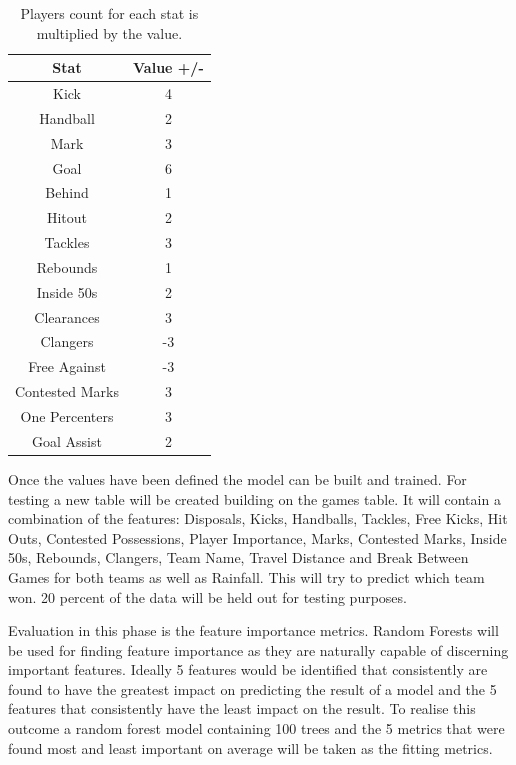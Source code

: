 \documentclass{imc-inf}
\begin{document}
	\begin{table}[h!]
		\centering	
		\begin{tabular}{| c | c |}
			\hline
			Stat & Value +/- \\
			\hline
			Kick & 4 \\
			\hline
			Handball & 2 \\
			\hline
			Mark & 3 \\
			\hline
			Goal & 6 \\
			\hline
			Behind & 1 \\
			\hline
			Hitout & 2 \\
			\hline
			Tackles & 3 \\
			\hline
			Rebounds & 1 \\
			\hline
			Inside 50s & 2\\
			\hline
			Clearances & 3 \\
			\hline
			Clangers & -3 \\
			\hline
			Free Against & -3 \\
			\hline
			Contested Marks & 3 \\
			\hline
			One Percenters & 3 \\
			\hline
			Goal Assist & 2 \\
			\hline
		\end{tabular}
		\caption{\label {tab:PlayerImportance}Players count for each stat is multiplied by the value.}
		
	\end{table}
	
	Once the values have been defined the model can be built and trained. 
	For testing a new table will be created building on the games table. It will contain a combination of the features: Disposals, Kicks, Handballs, Tackles, Free Kicks, Hit Outs, Contested Possessions, Player Importance, Marks, Contested Marks, Inside 50s, Rebounds, Clangers, Team Name, Travel Distance and Break Between Games for both teams as well as Rainfall. This will try to predict which team won. 20 percent of the data will be held out for testing purposes.
	
	Evaluation in this phase is the feature importance metrics. Random Forests will be used for finding feature importance as they are naturally capable of discerning important features. 
	Ideally 5 features would be identified that consistently are found to have the greatest impact on predicting the result of a model and the 5 features that consistently have the least impact on the result. To realise this outcome a random forest model containing 100 trees and the 5 metrics that were found most and least important on average will be taken as the fitting metrics.
	
\end{document}
